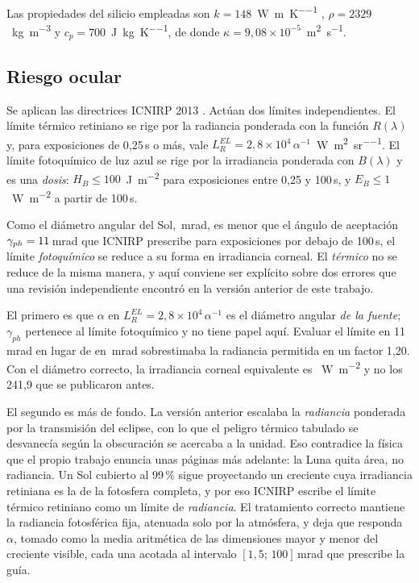 \documentclass[10pt,a4paper]{article}
\begin{document}
Las propiedades del silicio empleadas son
$k = 148$~\si{\watt\per\meter\per\kelvin} \cite{glassbrenner1964},
$\rho = 2329$~\si{\kilo\gram\per\cubic\meter} y
$c_p = 700$~\si{\joule\per\kilo\gram\per\kelvin}, de donde
$\kappa = 9{,}08\times10^{-5}$~\si{\square\meter\per\second}.

\subsection{Riesgo ocular}

Se aplican las directrices ICNIRP 2013 \cite{icnirp2013}. Actúan dos límites
independientes. El límite térmico retiniano se rige por la radiancia ponderada
con la función $R(\lambda)$ y, para exposiciones de 0,25\,s o más, vale
$L_R^{EL} = 2{,}8\times10^{4}\,\alpha^{-1}$~\si{\watt\per\square\meter\per\steradian}.
El límite fotoquímico de luz azul se rige por la irradiancia ponderada con
$B(\lambda)$ y es una \emph{dosis}: $H_B \le 100$~\si{\joule\per\square\meter}
para exposiciones entre 0,25 y 100\,s, y $E_B \le 1$~\si{\watt\per\square\meter}
a partir de 100\,s.

Como el diámetro angular del Sol, \alphaSunMrad\,mrad, es menor que el ángulo de
aceptación $\gamma_{ph} = 11$\,mrad que ICNIRP prescribe para exposiciones
por debajo de 100\,s, el límite \emph{fotoquímico} se reduce a su forma en
irradiancia corneal. El \emph{térmico} no se reduce de la misma manera, y aquí
conviene ser explícito sobre dos errores que una revisión independiente encontró
en la versión anterior de este trabajo.

El primero es que $\alpha$ en $L_R^{EL} = 2{,}8\times10^{4}\,\alpha^{-1}$ es el
diámetro angular \emph{de la fuente}; $\gamma_{ph}$ pertenece al límite
fotoquímico y no tiene papel aquí. Evaluar el límite en 11\,mrad en lugar de en
\alphaSunMrad\,mrad sobrestimaba la radiancia permitida en un factor 1,20. Con
el diámetro correcto, la irradiancia corneal equivalente es
\ERlimit~\si{\watt\per\square\meter} y no los 241,9 que se publicaron antes.

El segundo es más de fondo. La versión anterior escalaba la \emph{radiancia}
ponderada por la transmisión del eclipse, con lo que el peligro térmico tabulado
se desvanecía según la obscuración se acercaba a la unidad. Eso contradice la
física que el propio trabajo enuncia unas páginas más adelante: la Luna quita
área, no radiancia. Un Sol cubierto al 99\,\% sigue proyectando un creciente
cuya irradiancia retiniana es la de la fotosfera completa, y por eso ICNIRP
escribe el límite térmico retiniano como un límite de \emph{radiancia}. El
tratamiento correcto mantiene la radiancia fotosférica fija, atenuada solo por la
atmósfera, y deja que responda $\alpha$, tomado como la media aritmética de las
dimensiones mayor y menor del creciente visible, cada una acotada al intervalo
$[1{,}5;\,100]$\,mrad que prescribe la guía.
\end{document}
